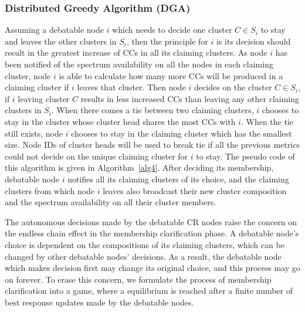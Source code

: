 \documentclass[times]{ettauth}
\newcommand{\ie}{i.e., }
\theoremstyle{mytheoremstyle}
\theoremstyle{mytheoremstyle}
\theoremstyle{mytheoremstyle}
\begin{document}
\subsubsection{Distributed Greedy Algorithm (DGA)}
Assuming a debatable node $i$ which needs to decide one cluster $C\in S_i$ to stay and leaves the other clusters in $S_i$, then the principle for $i$ is its decision should result in the greatest increase of CCs in all its claiming clusters.
As node $i$ has been notified of the spectrum availability on all the nodes in each claiming cluster, node $i$ is able to calculate how many more CCs will be produced in a claiming cluster if $i$ leaves that cluster.
Then node $i$ decides on the cluster $C\in S_i$, if $i$ leaving cluster $C$ results in less increased CCs than leaving any other claiming clusters in $S_i$.
When there comes a tie between two claiming clusters, $i$ chooses to stay in the cluster whose cluster head shares the most CCs with $i$.
When the tie still exists, node $i$ chooses to stay in the claiming cluster which has the smallest size.
Node IDs of cluster heads will be used to break tie if all the previous metrics could not decide on the unique claiming cluster for $i$ to stay.
The pseudo code of this algorithm is given in Algorithm~\ref{alg4}.
After deciding its membership, debatable node $i$ notifies all its claiming clusters of its choice, and the claiming clusters from which node $i$ leaves also broadcast their new cluster composition and the spectrum availability on all their cluster members.

The autonomous decisions made by the debatable CR nodes raise the concern on the endless chain effect in the membership clarification phase.
A debatable node's choice is dependent on the compositions of its claiming clusters, which can be changed by other debatable nodes' decisions.
As a result, the debatable node which makes decision first may change its original choice, and this process may go on forever.
To erase this concern, we formulate the process of membership clarification into a game, where a equilibrium is reached after a finite number of best response updates made by the debatable nodes.
\end{document}
